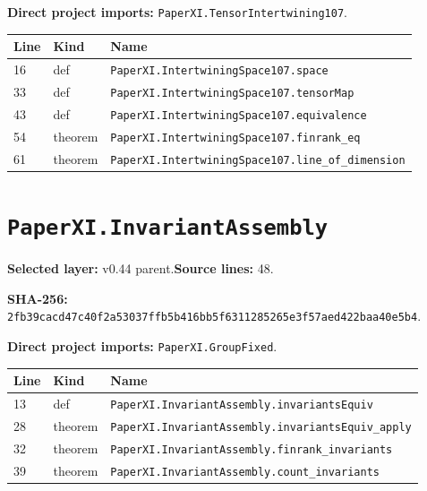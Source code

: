 \documentclass[10pt,oneside]{book}
\begin{document}

\textbf{Direct project imports:} \nolinkurl{PaperXI.TensorIntertwining107}.

\begin{longtable}{@{}p{}p{}p{}@{}}\toprule Line&Kind&Name\\\midrule\endhead

16&def&\nolinkurl{PaperXI.IntertwiningSpace107.space}\\

33&def&\nolinkurl{PaperXI.IntertwiningSpace107.tensorMap}\\

43&def&\nolinkurl{PaperXI.IntertwiningSpace107.equivalence}\\

54&theorem&\nolinkurl{PaperXI.IntertwiningSpace107.finrank_eq}\\

61&theorem&\nolinkurl{PaperXI.IntertwiningSpace107.line_of_dimension}\\

\bottomrule\end{longtable}

\section{\texorpdfstring{\nolinkurl{PaperXI.InvariantAssembly}}{PaperXI.InvariantAssembly}}\label{module:PaperXI.InvariantAssembly}

\textbf{Selected layer:} v0.44 parent.\quad\textbf{Source lines:} 48.\par\textbf{SHA-256:} {\scriptsize\nolinkurl{2fb39cacd47c40f2a53037ffb5b416bb5f6311285265e3f57aed422baa40e5b4}}.


\textbf{Direct project imports:} \nolinkurl{PaperXI.GroupFixed}.

\begin{longtable}{@{}p{}p{}p{}@{}}\toprule Line&Kind&Name\\\midrule\endhead

13&def&\nolinkurl{PaperXI.InvariantAssembly.invariantsEquiv}\\

28&theorem&\nolinkurl{PaperXI.InvariantAssembly.invariantsEquiv_apply}\\

32&theorem&\nolinkurl{PaperXI.InvariantAssembly.finrank_invariants}\\

39&theorem&\nolinkurl{PaperXI.InvariantAssembly.count_invariants}\\

\bottomrule\end{longtable}
\end{document}
